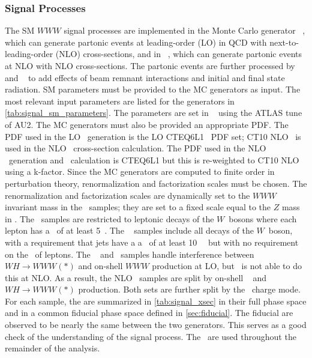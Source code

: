 \subsubsection{Signal Processes}
\label{sec:signal}



The SM $WWW$ signal processes are implemented in the Monte
Carlo generator \vbfnlo~\cite{Arnold:2011wj,Arnold:2012xn},
which can generate partonic events at leading-order (LO) in QCD with
next-to-leading-order (NLO) cross-sections, 
and in \madgraph~\cite{MadGraph}, which can generate
partonic events at NLO  with NLO cross-sections. 
The partonic events are further processed 
by \pythiaeight~\cite{Sjostrand:2007gs} and \photos~\cite{Golonka:2005pn} 
to add effects of beam remnant interactions and initial and 
final state radiation. 
SM parameters must be provided to the MC generators as input. 
The most relevant input parameters are listed 
for the generators in \tab\ref{tab:signal_sm_parameters}.
The parameters are set in \pythiaeight~ using the ATLAS tune 
of AU2\cite{atlas:2011zja}.
The MC generators must also be provided an appropriate PDF.
The PDF used  in the LO \vbfnlo~generation is
the LO CTEQ6L1~\cite{Pumplin:2002vw} PDF set;
CT10 NLO~\cite{guzzi:2011sv}
is used in the NLO \vbfnlo~cross-section calculation.
The PDF used in the NLO \madgraph~generation 
and \xsec~calculation is CTEQ6L1 
but this is re-weighted to CT10 NLO using a k-factor.
Since the MC generators are computed to finite order in perturbation
theory, renormalization and factorization scales must be chosen.
The renormalization and factorization scales are dynamically
set to the $WWW$ invariant mass in the \vbfnlo~samples; they 
are set to a fixed scale equal to the $Z$ mass in \madgraph.
The \vbfnlo~samples are restricted to leptonic decays of the $W$~bosons
where each lepton has a \pt~of at least 5~\GeV. The \madgraph~
samples include all decays of the $W$~boson, with a requirement 
that jets have a a \pt~of at least 10~\GeV~ but with no requirement
on the \pt~of leptons.
The \vbfnlo~ and \madgraph~samples handle interference 
between $WH\rightarrow WWW(*)$ 
and on-shell $WWW$ production at LO, but \madgraph~is not
able to do this at NLO. As a result, the NLO \madgraph~samples
are split by on-shell \www~ and $WH\rightarrow WWW(*)$ production.
Both sets are further split by the \www~charge mode.
For each sample, the \xsecs are summarized in \tab\ref{tab:signal_xsec} 
in their full phase space and in a common fiducial phase space
defined in \sec\ref{sec:fiducial}.  
The fiducial \xsecs are observed to be nearly the same
between the two generators.
This serves as a good check of the understanding of the 
signal process. The \madgraph~\xsecs are used throughout the 
remainder of the analysis.

